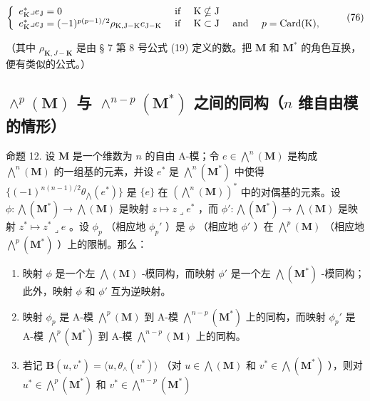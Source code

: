 \[
\left\{ \begin{array}{l l} e _ {\mathrm{K}} ^ {*} \lrcorner e _ {\mathrm{J}} = 0 & \text { if } \quad \mathrm{K} \nsubseteq \mathrm{J} \\ e _ {\mathrm{K}} ^ {*} \lrcorner e _ {\mathrm{J}} = (- 1) ^ {p (p - 1) / 2} \rho_ {\mathrm{K}, \mathrm{J} - \mathrm{K}} e _ {\mathrm{J} - \mathrm{K}} & \text { if } \quad \mathrm{K} \subset \mathrm{J} \quad \text { and } \quad p = \operatorname{Card} (\mathrm{K}), \end{array} \right.\tag{76}
\]

（其中 \(\rho_{\mathbf{K},J - \mathbf{K}}\) 是由 § 7 第 8 号公式 (19) 定义的数。把 \(\mathbf{M}\) 和 \(\mathbf{M}^*\) 的角色互换，便有类似的公式。）

\subsection{\texorpdfstring{\(\wedge^{p}(\mathbf{M})\) 与 \(\wedge^{n - p}(\mathbf{M}^{*})\) 之间的同构（\(n\) 维自由模的情形）}{\textbackslash wedge\^{}\{p\}(\textbackslash mathbf\{M\}) 与 \textbackslash wedge\^{}\{n - p\}(\textbackslash mathbf\{M\}\^{}\{*\}) 之间的同构（n 维自由模 M）}}

命题 12. 设 \(\mathbf{M}\) 是一个维数为 \(n\) 的自由 A-模；令 \(e \in \bigwedge^{n}(\mathbf{M})\) 是构成 \(\bigwedge^{n}(\mathbf{M})\) 的一组基的元素，并设 \(e^{*}\) 是 \(\bigwedge^{n}(\mathbf{M}^{*})\) 中使得 \(\{(-1)^{n(n-1)/2} \theta_{\bigwedge}(e^{*})\}\) 是 \(\{e\}\) 在 \((\bigwedge^{n}(\mathbf{M}))^{*}\) 中的对偶基的元素。设 \(\phi: \bigwedge(\mathbf{M}^{*}) \to \bigwedge(\mathbf{M})\) 是映射 \(z \mapsto z \lrcorner e^{*}\) ，而 \(\phi': \bigwedge(\mathbf{M}^{*}) \to \bigwedge(\mathbf{M})\) 是映射 \(z^{*} \mapsto z^{*} \lrcorner e\) 。设 \(\phi_{p}\) （相应地 \(\phi_{p}'\) ）是 \(\phi\) （相应地 \(\phi'\) ）在 \(\bigwedge^{p}(\mathbf{M})\) （相应地 \(\bigwedge^{p}(\mathbf{M}^{*})\) ）上的限制。那么：

\begin{enumerate}
\def\labelenumi{(\roman{enumi})}
\item
  映射 \(\phi\) 是一个左 \(\bigwedge (\mathbf{M})\) -模同构，而映射 \(\phi'\) 是一个左 \(\bigwedge (\mathbf{M}^*)\) -模同构；此外，映射 \(\phi\) 和 \(\phi'\) 互为逆映射。
\item
  映射 \(\phi_p\) 是 A-模 \(\bigwedge^p (\mathbf{M})\) 到 A-模 \(\bigwedge^{n - p}(\mathbf{M}^*)\) 上的同构，而映射 \(\phi_p'\) 是 A-模 \(\bigwedge^p (\mathbf{M}^*)\) 到 A-模 \(\bigwedge^{n - p}(\mathbf{M})\) 上的同构。
\item
  若记 \(\mathbf{B}(u,v^{*}) = \langle u,\theta_{\wedge}(v^{*})\rangle\) （对 \(u\in \bigwedge (\mathbf{M})\) 和 \(v^{*}\in \bigwedge (\mathbf{M}^{*})\) ），则对 \(u^{*}\in \bigwedge^{p}(\mathbf{M}^{*})\) 和 \(v^{*}\in \bigwedge^{n - p}(\mathbf{M}^{*})\)
\end{enumerate}

